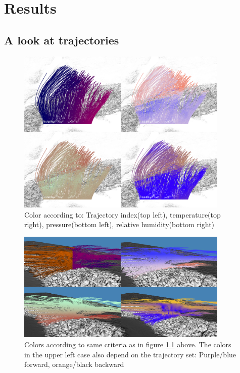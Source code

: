 \chapter{Results}

\section{A look at trajectories}
\begin{figure}
\centering \includegraphics*[width=0.9\textwidth]{figures/0627_sued}
\caption{Color according to: Trajectory index(top left), temperature(top right), pressure(bottom left), relative humidity(bottom right)}
\label{fig:2by2_sued}
\end{figure}
\begin{figure}
\centering \includegraphics*[width=0.9\textwidth]{figures/0627_chur}
\caption{Colors according to same criteria as in figure \ref{fig:2by2_sued} above. The colors in the upper left case also depend on the trajectory set: Purple/blue forward, orange/black backward}
\label{fig:2by2_chur}
\end{figure}


